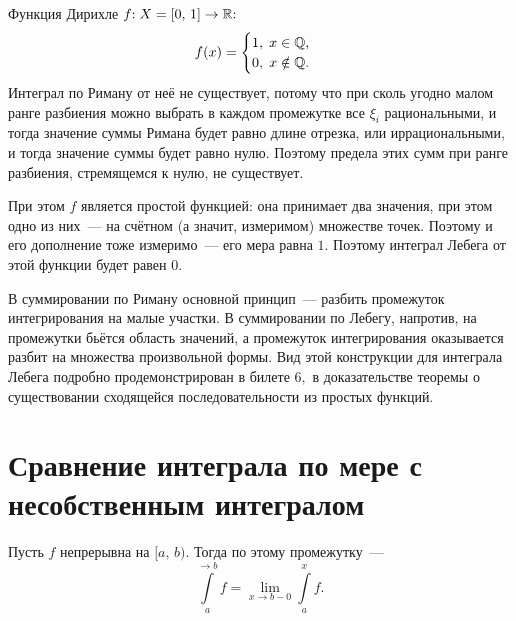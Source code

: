 \documentclass{notes}
\begin{document}
	\begin{exm}
		Функция Дирихле $f\text{\text{:}} \; X = [0, \, 1] \to \mathbb{R}\text{\text{:}}$
		\[
			f(x) = \begin{cases}
				1, \; x \in \mathbb{Q}, \\
				0, \; x \notin \mathbb{Q}.
			\end{cases}
		\]
		Интеграл по Риману от неё не существует, потому что при сколь угодно малом ранге разбиения можно выбрать в каждом промежутке все $\xi_i$ рациональными, и тогда значение суммы Римана будет равно длине отрезка, или иррациональными, и тогда значение суммы будет равно нулю. Поэтому предела этих сумм при ранге разбиения, стремящемся к нулю, не существует.

		При этом $f$ является простой функцией: она принимает два значения, при этом одно из них~--- на счётном (а значит, измеримом) множестве точек. Поэтому и его дополнение тоже измеримо~--- его мера равна $1$. Поэтому интеграл Лебега от этой функции будет равен $0$.

		В суммировании по Риману основной принцип~--- разбить промежуток интегрирования на малые участки. В суммировании по Лебегу, напротив, на промежутки бьётся область значений, а промежуток интегрирования оказывается разбит на множества произвольной формы. Вид этой конструкции для интеграла Лебега подробно продемонстрирован в билете $6,$ в доказательстве теоремы о существовании сходящейся последовательности из простых функций.
	\end{exm}

\section{Сравнение интеграла по мере с несобственным интегралом}

	\begin{de}[Напоминание]
		Пусть $f$ непрерывна на $[a, \, b)$. Тогда  по этому промежутку~---
		\[
			\int\limits_a^{\to b} f = \lim\limits_{x \to b-0} \int\limits_a^{x} f.
		\]
	\end{de}
\end{document}
